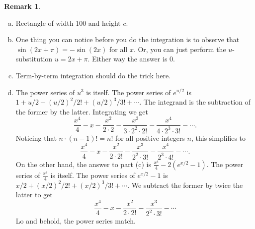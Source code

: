 \documentclass[11pt,oneside]{amsart}
\theoremstyle{definition}
\newtheorem{remark}{Remark}
\begin{document}
\begin{remark}
  \begin{enumerate}[(a)]
    \item Rectangle of width 100 and height $c$.
    \item One thing you can notice before you do the integration is to observe that $\sin(2x+\pi)=-\sin(2x)$ for all $x$. Or, you can just perform the $u$-substitution $u=2x+\pi$. Either way the answer is 0.
    \item Term-by-term integration should do the trick here.
    \item The power series of $u^3$ is itself. The power series of $e^{u/2}$ is $1+u/2+(u/2)^2/2!+(u/2)^3/3!+\cdots$. The integrand is the subtraction of the former by the latter. Integrating we get
          \[\frac{x^4}4-x-\frac{x^2}{2\cdot 2}-\frac{x^3}{3\cdot 2^2\cdot 2!}-\frac{x^4}{4\cdot 2^3\cdot 3!}-\cdots.\]
          Noticing that $n\cdot (n-1)!=n!$ for all positive integers $n$, this simplifies to
          \[\frac{x^4}4-x-\frac{x^2}{2\cdot 2!}-\frac{x^3}{2^2\cdot 3!}-\frac{x^4}{2^3\cdot 4!}-\cdots.\]
          On the other hand, the answer to part (c) is $\frac{x^4}4-2(e^{x/2}-1)$. The power series of $\frac{x^4}4$ is itself. The power series of $e^{x/2}-1$ is $x/2+(x/2)^2/2!+(x/2)^3/3!+\cdots$. We subtract the former by twice the latter to get
          \[\frac{x^4}4-x-\frac{x^2}{2\cdot 2!}-\frac{x^3}{2^2\cdot 3!}-\cdots\]
          Lo and behold, the power series match.


\end{enumerate}
\end{remark}
\end{document}
